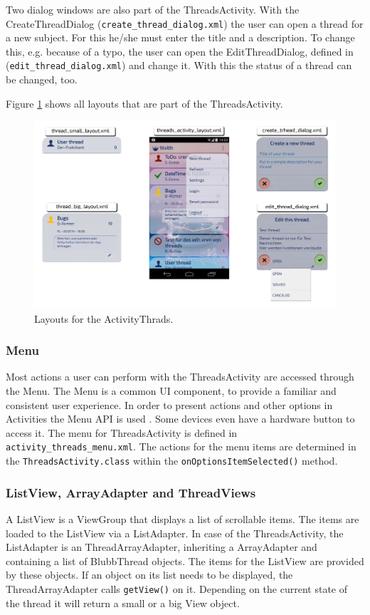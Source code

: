 \documentclass[12pt,a4paper,oneside]{report}
\newcommand{\code}[1]{\lstinline{#1}}
\begin{document}
Two dialog windows are also part of the ThreadsActivity. With the CreateThreadDialog (\code{create_thread_dialog.xml}) the user can open a thread for a new subject. For this he/she must enter the title and a description. To change this, e.g. because of a typo, the user can open the EditThreadDialog, defined in (\code{edit_thread_dialog.xml}) and change it. With this the status of a thread can be changed, too.

Figure \ref{fig:ThreadsActivityLayouts} shows all layouts that are part of the ThreadsActivity.

\begin{figure}[!ht]
	\centering
    \includegraphics[width=\linewidth]{ThreadsActivityLayouts.png}
	\caption{Layouts for the ActivityThrads.}
	\label{fig:ThreadsActivityLayouts}
\end{figure}


\subsubsection{Menu}
Most actions a user can perform with the ThreadsActivity are accessed through the Menu. The Menu is a common UI component, to provide a familiar and consistent user experience. In order to present actions and other options in Activities the Menu API is used \citep{aDefMenu}. Some devices even have a hardware button to access it. The menu for ThreadsActivity is defined in \code{activity_threads_menu.xml}.
 The actions for the menu items are determined in the \code{ThreadsActivity.class} within the \code{onOptionsItemSelected()} method.

\subsubsection{ListView, ArrayAdapter and ThreadViews}
A ListView is a ViewGroup that displays a list of scrollable items\citep{aDefListView}. The items are loaded to the ListView via a ListAdapter. In case of the ThreadsActivity, the ListAdapter is an ThreadArrayAdapter, inheriting a ArrayAdapter and containing a list of BlubbThread objects. The items for the ListView are provided by these objects. If an object on its list needs to be displayed, the ThreadArrayAdapter calls \code{getView()} on it. Depending on the current state of the thread it will return a small or a big View object. 
\end{document}
